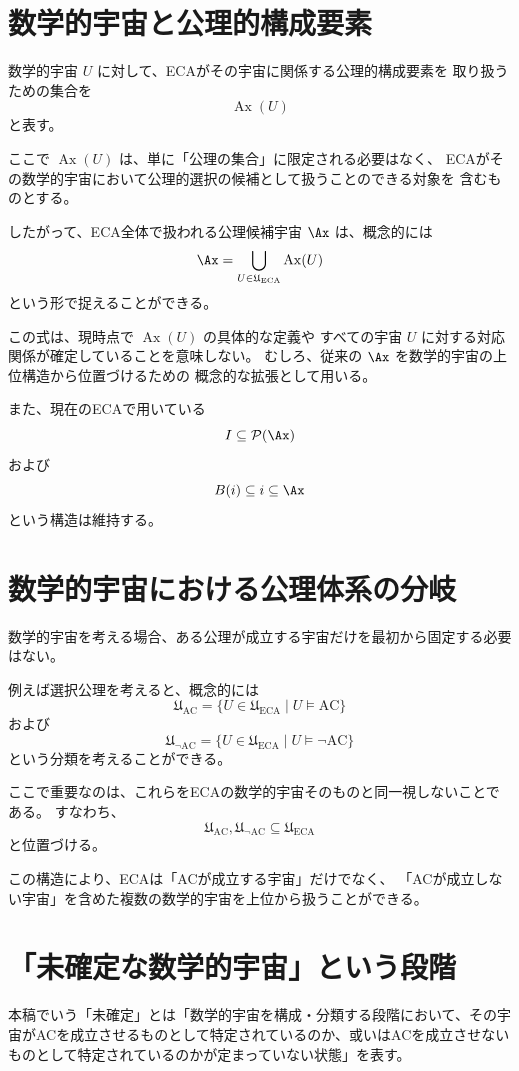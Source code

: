 \documentclass[11pt,a4paper]{article}
\begin{document}
\section{数学的宇宙と公理的構成要素}

数学的宇宙 \(U\) に対して、ECAがその宇宙に関係する公理的構成要素を
取り扱うための集合を
\[
\operatorname{Ax}(U)
\]
と表す。

ここで \(\operatorname{Ax}(U)\) は、単に「公理の集合」に限定される必要はなく、
ECAがその数学的宇宙において公理的選択の候補として扱うことのできる対象を
含むものとする。

したがって、ECA全体で扱われる公理候補宇宙 \(\Ax\) は、概念的には
\[
\Ax
=
\bigcup_{U\in\mathfrak{U}_{\mathrm{ECA}}}
\operatorname{Ax}(U)
\]
という形で捉えることができる。

この式は、現時点で \(\operatorname{Ax}(U)\) の具体的な定義や
すべての宇宙 \(U\) に対する対応関係が確定していることを意味しない。
むしろ、従来の \(\Ax\) を数学的宇宙の上位構造から位置づけるための
概念的な拡張として用いる。

また、現在のECAで用いている
\[
I\subseteq\mathcal{P}(\Ax)
\]
および
\[
B(i)\subseteq i\subseteq\Ax
\]
という構造は維持する。

\section{数学的宇宙における公理体系の分岐}

数学的宇宙を考える場合、ある公理が成立する宇宙だけを最初から固定する必要はない。

例えば選択公理を考えると、概念的には
\[
\mathfrak{U}_{\mathrm{AC}}
=
\{U\in\mathfrak{U}_{\mathrm{ECA}}\mid U\models\mathrm{AC}\}
\]
および
\[
\mathfrak{U}_{\neg\mathrm{AC}}
=
\{U\in\mathfrak{U}_{\mathrm{ECA}}\mid U\models\neg\mathrm{AC}\}
\]
という分類を考えることができる。

ここで重要なのは、これらをECAの数学的宇宙そのものと同一視しないことである。
すなわち、
\[
\mathfrak{U}_{\mathrm{AC}},
\mathfrak{U}_{\neg\mathrm{AC}}
\subseteq
\mathfrak{U}_{\mathrm{ECA}}
\]
と位置づける。

この構造により、ECAは「ACが成立する宇宙」だけでなく、
「ACが成立しない宇宙」を含めた複数の数学的宇宙を上位から扱うことができる。

\section{「未確定な数学的宇宙」という段階}
本稿でいう「未確定」とは「数学的宇宙を構成・分類する段階において、その宇宙がACを成立させるものとして特定されているのか、或いはACを成立させないものとして特定されているのかが定まっていない状態」を表す。
\end{document}

